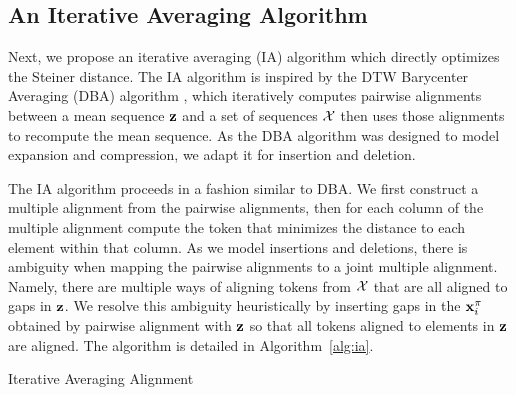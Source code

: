 \documentclass{article}
\begin{document}
\subsection{An Iterative Averaging Algorithm}
Next, we propose an iterative averaging (IA)
algorithm which directly optimizes the Steiner distance.
The IA algorithm is inspired by the
DTW Barycenter Averaging (DBA) algorithm \citep{petitjean2011dba},
which iteratively computes pairwise alignments between a mean sequence $\bz$
and a set of sequences $\mathcal{X}$ then uses those alignments to recompute the mean sequence. 
As the DBA algorithm was designed to model expansion and compression, 
we adapt it for insertion and deletion.

The IA algorithm proceeds in a fashion similar to DBA.
We first construct a multiple alignment from the
pairwise alignments, then for each column of the multiple alignment
compute the token that minimizes the distance to each element within that column.
As we model insertions and deletions,
there is ambiguity when mapping the pairwise alignments to a joint multiple alignment.
Namely, there are multiple ways of aligning tokens from $\mathcal{X}$ that are all aligned to gaps
in $\bz$.
We resolve this ambiguity heuristically by inserting gaps in
the $\mathbf{x}_i^\pi$ obtained by pairwise alignment with $\bz$
so that all tokens aligned to elements in $\bz$ are aligned.
The algorithm is detailed in Algorithm~\ref{alg:ia}.

\begin{algorithm}[h]
\begin{algorithmic}

    \EndFor
\EndFor
{}
\EndFunction

\EndWhile
{}
\EndFunction

\Else
{}
\EndIf
\EndFor
\Return{$\bz$}
\EndFunction

\end{algorithmic}
\caption{\label{alg:ia}
Iterative Averaging Alignment
}
\end{algorithm}
\end{document}
